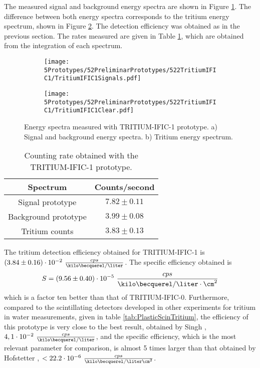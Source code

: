 The measured signal and background energy spectra are shown in Figure \ref{subfig:SignalBackgroundEnergySpectraTritiumIFIC1}. The difference between both energy spectra corresponds to the tritium energy spectrum, shown in Figure \ref{subfig:TritiumEnergySpectraTritiumIFIC1}. The detection efficiency was obtained as in the previous section. The rates measured are given in Table \ref{tab:CountsPerSecondTRITIUMIFIC1}, which are obtained from the integration of each spectrum.

\begin{figure}
\centering
    \begin{subfigure}[b]{1\textwidth}
    \centering
    \texttt{[image: 5Prototypes/52PreliminarPrototypes/522TritiumIFIC1/TritiumIFIC1Signals.pdf]}  
    \caption{\label{subfig:SignalBackgroundEnergySpectraTritiumIFIC1}}
    \end{subfigure}
    \hfill
    \begin{subfigure}[b]{1\textwidth}
    \centering
    \texttt{[image: 5Prototypes/52PreliminarPrototypes/522TritiumIFIC1/TritiumIFIC1Clear.pdf]}  
    \caption{\label{subfig:TritiumEnergySpectraTritiumIFIC1}}
    \end{subfigure}
 \caption{Energy spectra measured with TRITIUM-IFIC-1 prototype. a) Signal and background energy spectra. b) Tritium energy spectrum.}
 \label{fig:EnergySpectraTRITIUMIFIC1}
\end{figure}

\begin{table}[htbp]
\centering{}%
\begin{tabular}{cc}
\toprule 
Spectrum & Counts/second \tabularnewline
\midrule
\midrule 
Signal prototype & $7.82 \pm 0.11$ \tabularnewline
Background prototype & $3.99 \pm 0.08$ \tabularnewline  
Tritium counts & $3.83 \pm 0.13$ \tabularnewline
\bottomrule
\end{tabular}
\caption{Counting rate obtained with the TRITIUM-IFIC-1 prototype.}
\label{tab:CountsPerSecondTRITIUMIFIC1}
\end{table}

The tritium detection efficiency obtained for TRITIUM-IFIC-1 is $(3.84 \pm 0.16)\cdot{} 10^{-2}~\frac{cps}{\kilo\becquerel/\liter}$. The specific efficiency obtained is
$$S=(9.56 \pm 0.40)\cdot{} 10^{-5}~\frac{cps}{\kilo\becquerel/\liter \cdot{} \cm^{2}}$$
which is a factor ten better than that of TRITIUM-IFIC-0. Furthermore, compared to the scintillating detectors developed in other experiments for tritium in water measurements, given in table \ref{tab:PlasticScinTritium}, the efficiency of this prototype is very close to the best result, obtained by Singh \cite{Ratnakaran, Ratnakaran2000}, $4,1 \cdot{} 10^{-2}~\frac{cps}{\kilo\becquerel/\liter}$, and the specific efficiency, which is the most relevant parameter for comparison, is almost 5 times larger than that obtained by Hofstetter \cite{Hofstetter1, Hofstetter2}, $<22.2 \cdot{} 10^{-6}~\frac{cps}{\kilo\becquerel/\liter\cm^{2}}$.
